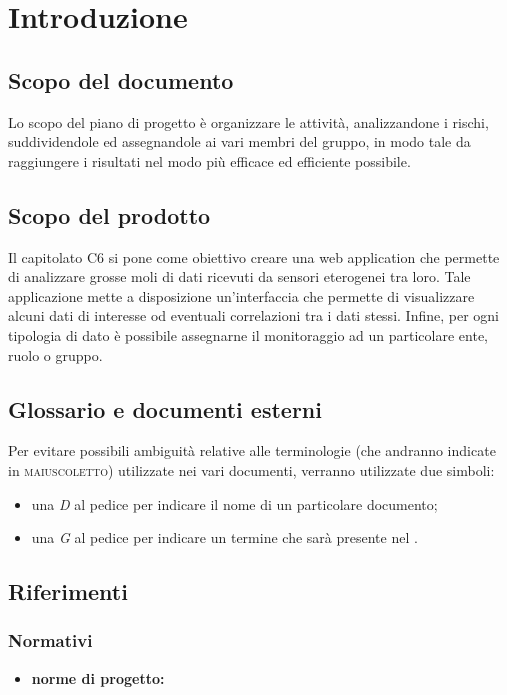\section{Introduzione}

	\subsection{Scopo del documento}
		Lo scopo del piano di progetto è organizzare le attività, analizzandone i rischi, suddividendole ed assegnandole ai vari membri del gruppo, in modo tale da raggiungere i risultati nel modo più efficace ed efficiente possibile. 
	\subsection{Scopo del prodotto}
		Il capitolato C6 si pone come obiettivo creare una web application che permette di analizzare grosse moli di dati ricevuti da sensori eterogenei tra loro. Tale applicazione mette a disposizione un'interfaccia che permette di visualizzare alcuni dati di interesse od eventuali correlazioni tra i dati stessi. Infine, per ogni tipologia di dato è possibile assegnarne il monitoraggio ad un particolare ente, ruolo o gruppo.
	\subsection{Glossario e documenti esterni}
		Per evitare possibili ambiguità relative alle terminologie (che andranno indicate in \textsc{maiuscoletto}) utilizzate nei vari documenti, verranno utilizzate due simboli:
		\begin{itemize}
			\item una \textit{D} al pedice per indicare il nome di un particolare documento;
			\item una \textit{G} al pedice per indicare un termine che sarà presente nel .
		\end{itemize}
	\subsection{Riferimenti}
		\subsubsection{Normativi}
		\begin{itemize}
			\item \textbf{norme di progetto:}  
		\end{itemize}			

